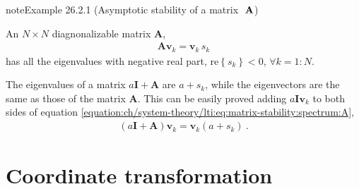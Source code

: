 \documentclass[letterpaper,10pt,english]{jupyterBook}
\begin{document}
\begin{sphinxadmonition}{note}{Example 26.2.1 (Asymptotic stability of a matrix \protect\(\ \mathbf{A}\protect\))}



\sphinxAtStartPar
An \(N \times N\) diagnonalizable matrix \(\mathbf{A}\),
\begin{equation}\label{equation:ch/system-theory/lti:eq:matrix-stability:spectrum:A}
\begin{split}\mathbf{A} \mathbf{v}_k = \mathbf{v}_k \, s_k\end{split}
\end{equation}
\sphinxAtStartPar
has all the eigenvalues with negative real part, \(\text{re}\left\{ s_k \right\} < 0\), \(\forall k=1:N\).

\sphinxAtStartPar
The eigenvalues of a matrix \(a \mathbf{I} + \mathbf{A}\) are \(a + s_k\), while the eigenvectors are the same as those of the matrix \(\mathbf{A}\). This can be easily proved adding \(a \mathbf{I} \mathbf{v}_k\) to both sides of equation \eqref{equation:ch/system-theory/lti:eq:matrix-stability:spectrum:A},
\begin{equation*}
\begin{split}\left( a \mathbf{I} + \mathbf{A} \right) \mathbf{v}_k = \mathbf{v}_k (a + s_k) \ .\end{split}
\end{equation*}\end{sphinxadmonition}

\sphinxAtStartPar
{}

\sphinxstepscope


\chapter{Coordinate transformation}
\label{\detokenize{ch/system-theory/coordinate-transformation:coordinate-transformation}}\label{\detokenize{ch/system-theory/coordinate-transformation:system-theory-coordinate-transformation}}\label{\detokenize{ch/system-theory/coordinate-transformation::doc}}
\end{document}
